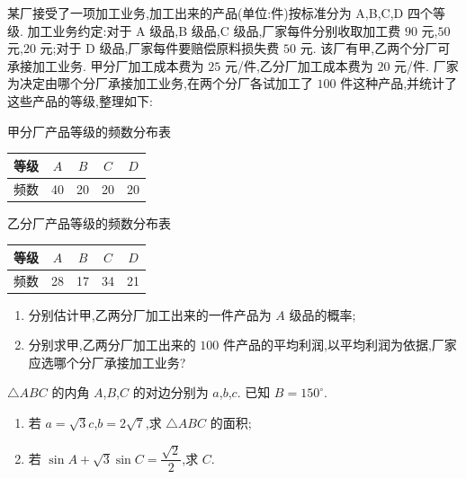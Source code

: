 \begin{problem}
某厂接受了一项加工业务,加工出来的产品(单位:件)按标准分为 A,B,C,D 四个等级. 加工业务约定:对于 A 级品,B 级品,C 级品,厂家每件分别收取加工费 \(90\) 元,\(50\) 元,\(20\) 元;对于 D 级品,厂家每件要赔偿原料损失费 \(50\) 元. 该厂有甲,乙两个分厂可承接加工业务. 甲分厂加工成本费为 \(25\) 元/件,乙分厂加工成本费为 \(20\) 元/件. 厂家为决定由哪个分厂承接加工业务,在两个分厂各试加工了 \(100\) 件这种产品,并统计了这些产品的等级,整理如下:

\begin{center}
甲分厂产品等级的频数分布表

\begin{tabular}{c|cccc}
\hline
等级 & \(A\) & \(B\) & \(C\) & \(D\) \\
\hline
频数 & 40 & 20 & 20 & 20 \\
\hline
\end{tabular}
\end{center}

\begin{center}
乙分厂产品等级的频数分布表

\begin{tabular}{c|cccc}
\hline
等级 & \(A\) & \(B\) & \(C\) & \(D\) \\
\hline
频数 & 28 & 17 & 34 & 21 \\
\hline
\end{tabular}
\end{center}

\begin{enumerate}
\item 分别估计甲,乙两分厂加工出来的一件产品为 \(A\) 级品的概率;

\item 分别求甲,乙两分厂加工出来的 \(100\) 件产品的平均利润,以平均利润为依据,厂家应选哪个分厂承接加工业务?
\end{enumerate}
\end{problem}

\begin{problem}
\(\triangle ABC\) 的内角 \(A\),\(B\),\(C\) 的对边分别为 \(a\),\(b\),\(c\). 已知 \(B=150^{\circ}\).

\begin{enumerate}
\item 若 \(a=\sqrt{3}c\),\(b=2\sqrt{7}\),求 \(\triangle ABC\) 的面积;

\item 若 \(\sin A+\sqrt{3}\sin C=\dfrac{\sqrt{2}}{2}\),求 \(C\).
\end{enumerate}
\end{problem}


